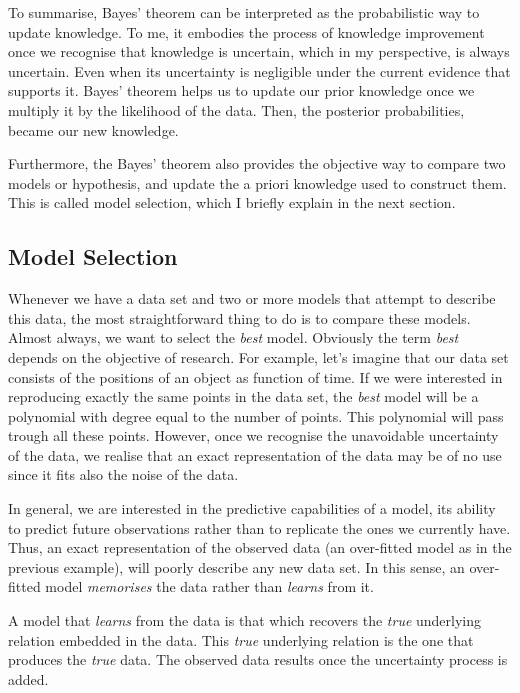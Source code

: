 To summarise, Bayes' theorem can be interpreted as the probabilistic way to update knowledge. To me, it embodies the process of knowledge improvement once we recognise that knowledge is uncertain, which in my perspective, is always uncertain. Even when its uncertainty is negligible under the current evidence that supports it. Bayes' theorem helps us to update our prior knowledge once we multiply it by the likelihood of the data. Then, the posterior probabilities, became our new knowledge. 

Furthermore, the Bayes' theorem also provides the objective way to compare two models or hypothesis, and update the a priori knowledge used to construct them. This is called model selection, which I  briefly explain in the next section.

\subsection{Model Selection}
\label{sect:modelselection}

Whenever we have a data set and two or more models that attempt to describe this data, the most straightforward thing to do is to compare these models. Almost always, we want to select the \emph{best} model. Obviously the term \emph{best} depends on the objective of research. For example, let's imagine that our data set consists of the positions of an object as function of time. If we were interested in reproducing exactly the same points in the data set, the \emph{best} model will be a polynomial with degree equal to the number of points. This polynomial will pass trough all these points. However, once we recognise the unavoidable uncertainty of the data, we realise that an exact representation of the data may be of no use since it fits also the noise of the data. 

In general, we are interested in the predictive capabilities of a model, its ability to predict future observations rather than to replicate the ones we currently have. Thus, an exact representation of the observed data (an over-fitted model as in the previous example), will poorly describe any new data set. In this sense, an over-fitted model \emph{memorises} the data rather than \emph{learns} from it.

A model that \emph{learns} from the data is that which recovers the \emph{true} underlying relation embedded in the data. This \emph{true} underlying relation is the one that produces the \emph{true} data. The observed data results once the uncertainty process is added. 

